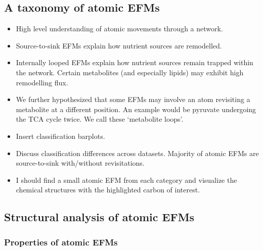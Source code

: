 \documentclass[11pt]{article}
\begin{document}
\subsection{A taxonomy of atomic EFMs}

\begin{itemize}
    \item High level understanding of atomic movements through a network.
    \item Source-to-sink EFMs explain how nutrient sources are remodelled.
    \item Internally looped EFMs explain how nutrient sources remain trapped within the network. Certain metabolites (and especially lipids) may exhibit high remodelling flux.
    \item We further hypothesized that some EFMs may involve an atom revisiting a metabolite at a different position. An example would be pyruvate undergoing the TCA cycle twice. We call these `metabolite loops'.
    \item Insert classification barplots.
    \item Discuss classification differences across datasets. Majority of atomic EFMs are source-to-sink with/without revisitations.
    \item I should find a small atomic EFM from each category and visualize the chemical structures with the highlighted carbon of interest.
\end{itemize}

\subsection{Structural analysis of atomic EFMs}

\subsubsection{Properties of atomic EFMs}
\end{document}
